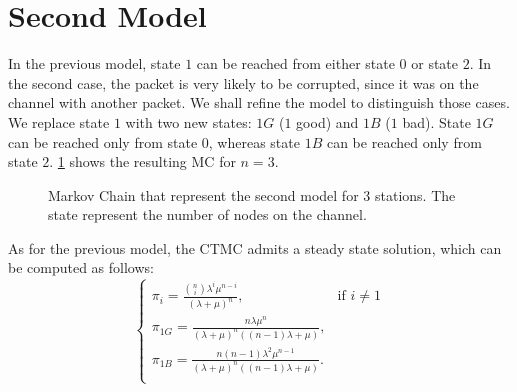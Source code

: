 \section{Second Model}
\label{sec:second_model}

In the previous model, state $1$ can be reached from either state $0$ or state $2$.
In the second case, the packet is very likely to be corrupted, since it was on the channel with another packet.
We shall refine the model to distinguish those cases.
We replace state $1$ with two new states: $1G$ ($1$ good) and $1B$ ($1$ bad).
State $1G$ can be reached only from state $0$, whereas state $1B$ can be reached only from state $2$.
\cref{fig:model2} shows the resulting \ac{MC} for $n=3$.

\begin{figure}[t!]
    \centering
    \caption{Markov Chain that represent the second model for $3$ stations. The state represent the number of nodes on the channel.}
    \label{fig:model2}
\end{figure}

As for the previous model, the \ac{CTMC} admits a steady state solution, which can be computed as follows:
\begin{equation*}
    \begin{cases}
        \pi_i = \frac{\binom{n}{i} \lambda^i \mu^{n-i}}{(\lambda + \mu)^n}, & \mbox{if } i \neq 1 \\[1em]
        \pi_{1G} = \frac{n \lambda \mu^n}{(\lambda + \mu)^n((n-1)\lambda + \mu)}, \\[1em]
        \pi_{1B} = \frac{n(n-1) \lambda^2 \mu^{n-1}}{(\lambda + \mu)^n((n-1)\lambda + \mu)}. \\
    \end{cases}
\end{equation*}

